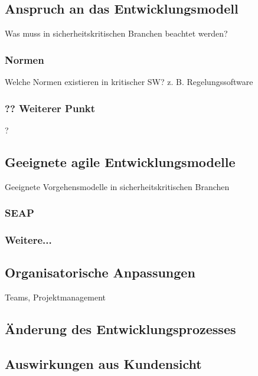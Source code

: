 \subsection{Anspruch an das Entwicklungsmodell}

Was muss in sicherheitskritischen Branchen beachtet werden?

\subsubsection{Normen}

Welche Normen existieren in kritischer SW? z. B. Regelungssoftware

\subsubsection{?? Weiterer Punkt}

?

\subsection{Geeignete agile Entwicklungsmodelle}

Geeignete Vorgehensmodelle in sicherheitskritischen Branchen

\subsubsection{SEAP}

\subsubsection{Weitere...}


\subsection{Organisatorische Anpassungen}

Teams, Projektmanagement

\subsection{Änderung des Entwicklungsprozesses}

\subsection{Auswirkungen aus Kundensicht}




